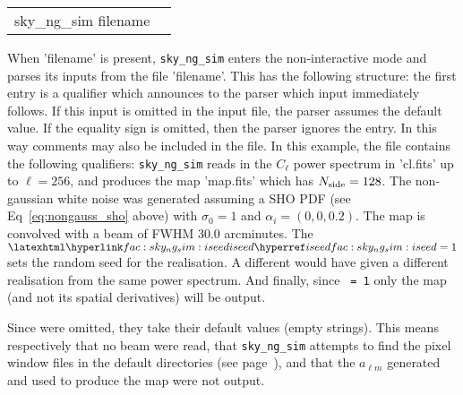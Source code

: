 \begin{examples}{2}
{
\begin{tabular}{ll} %
sky\_ng\_sim  filename \\
\end{tabular}
}
{When 'filename' is present, {\tt sky\_ng\_sim} enters the non-interactive mode and parses
its inputs from the file 'filename'. This has the following
structure: the first entry is a qualifier which announces to the parser
which input immediately follows. If this input is omitted in the
input file, the parser assumes the default value.
If the equality sign is omitted, then the parser ignores the entry.
In this way comments may also be included in the file.
In this example, the file contains the following qualifiers:\hfill\newline
{}
{\tt sky\_ng\_sim} reads in the $C_\ell$ power spectrum in 'cl.fits' up to $\ell=256$, and produces the map
'map.fits' which has $N_{\mathrm{side}}=128$. The non-gaussian white noise was generated
assuming a SHO PDF (see Eq~\ref{eq:nongauss_sho} above) with $\sigma_0=1$ and
$\alpha_i = (0, 0, 0.2)$.
The map is convolved with a beam of FWHM 30.0 arcminutes. The $\mylink{fac:sky_ng_sim:iseed}{iseed}%
=1$ sets
the random seed for the realisation. A different %
 would have given a different 
realisation from the same power spectrum. And finally, since {\tt {}%
 =
1} only the map (and not its spatial derivatives) will be output.

Since \hfill\newline
{}
were omitted, they take their default values (empty strings). 
This means respectively that no beam were read, that {\tt sky\_ng\_sim} attempts to find the pixel
window files in the default directories (see page~\pageref{page:defdir}), and
that the $a_{\ell m}$ generated and used to produce the map were not output.
}
\end{examples}

